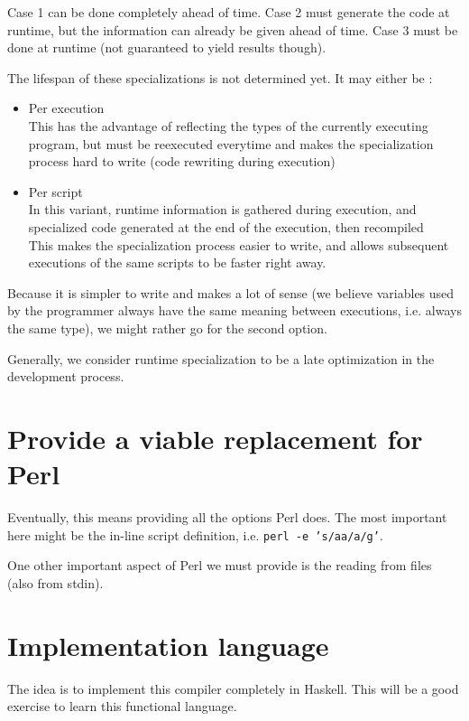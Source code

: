 \documentclass[11pt,a4paper]{report}
\newcommand{\pgl}[1]{\textsf{#1}}
\newcommand{\bash}[1]{\texttt{#1}}
\begin{document}
Case 1 can be done completely ahead of time. Case 2 must generate the code at runtime, but the information can already be given ahead of time. Case 3 must be done at runtime (not guaranteed to yield results though).

The lifespan of these specializations is not determined yet. It may either be :
\begin{itemize}
\item Per execution \\
This has the advantage of reflecting the types of the currently executing program, but must be reexecuted everytime and makes the specialization process hard to write (code rewriting during execution)
\item Per script \\
In this variant, runtime information is gathered during execution, and specialized code generated at the end of the execution, then recompiled\\
This makes the specialization process easier to write, and allows subsequent executions of the same scripts to be faster right away.
\end{itemize}

Because it is simpler to write and makes a lot of sense (we believe variables used by the programmer always have the same meaning between executions, i.e. always the same type), we might rather go for the second option.

Generally, we consider runtime specialization to be a late optimization in the development process.

\section{Provide a viable replacement for Perl}

Eventually, this means providing all the options \pgl{Perl} does. The most important here might be the in-line script definition, i.e. \bash{perl -e 's/aa/a/g'}.

One other important aspect of \pgl{Perl} we must provide is the reading from files (also from stdin).

\section{Implementation language}

The idea is to implement this compiler completely in \pgl{Haskell}. This will be a good exercise to learn this functional language.
\end{document}
